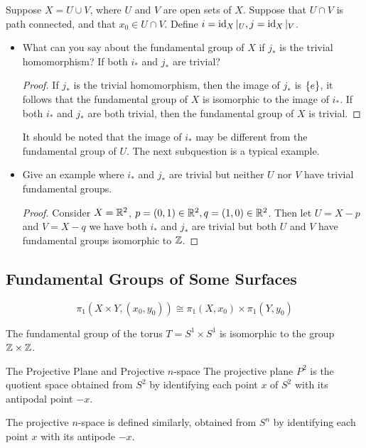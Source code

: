 \documentclass[12pt,a4paper]{article}
\begin{document}
    \begin{ex}
         Suppose $X=U\cup V$, where $U$ and $V$ are open sets of $X$. Suppose that $U\cap V$ is path connected, and that $x_0\in U\cap V$. Define $i=\operatorname{id}_X|_U,j=\operatorname{id}_X|_V$.
         \begin{itemize}
             \item What can you say about the fundamental group of $X$ if $j_*$ is the trivial homomorphism? If both $i_*$ and $j_*$ are trivial?
             \begin{proof}
                 If $j_*$ is the trivial homomorphism, then the image of $j_*$ is $\left\{ e \right\}$, it follows that the fundamental group of $X$ is isomorphic to the image of $i_*$. If both $i_*$ and $j_*$ are both trivial, then the fundamental group of $X$ is trivial.
             \end{proof}
             \begin{remark}
                 It should be noted that the image of $i_*$ may be different from the fundamental group of $U$. The next subquestion is a typical example.
             \end{remark}
             \item Give an example where $i_*$ and $j_*$ are trivial but neither $U$ nor $V$ have trivial fundamental groups.
             \begin{proof}
                 Consider $X=\mathbb{R}^2$, $p=(0,1)\in\mathbb{R}^2,q=(1,0)\in\mathbb{R}^2$. Then let $U=X-p$ and $V=X-q$ we have both $i_*$ and $j_*$ are trivial but both $U$ and $V$ have fundamental groups isomorphic to $\mathbb{Z}$.
             \end{proof}
         \end{itemize}
    \end{ex}
    \bigskip

    \subsection{Fundamental Groups of Some Surfaces}
    \begin{thm}
        \[
            \pi_1(X\times Y,(x_0,y_0))\cong\pi_1(X,x_0)\times\pi_1(Y,y_0)
        \]
    \end{thm}
    \begin{cor}
        The fundamental group of the torus $T=S^1\times S^1$ is isomorphic to the group $\mathbb{Z}\times\mathbb{Z}$.
    \end{cor}
    \bigskip

    \begin{defi}{The Projective Plane and Projective $n$-space}
        The projective plane $P^2$ is the quotient space obtained from $S^2$ by identifying each point $x$ of $S^2$ with its antipodal point $-x$.

        The projective $n$-space is defined similarly, obtained from $S^n$ by identifying each point $x$ with its antipode $-x$.
    \end{defi}
    \bigskip
\end{document}
